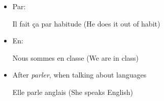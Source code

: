 \documentclass{book}
\begin{document}
\begin{itemize}
\begin{itemize}
                    \item Par:
                        \begin{center}
                            Il fait ça par habitude (He does it out of habit)
                        \end{center}

                    \item En: 
                        \begin{center}
                            Nous sommes en classe (We are in class)
                        \end{center}

                    \item After \textit{parler}, when talking about languages
                        \begin{center}
                            Elle parle anglais (She speaks English)
                        \end{center}
                \end{itemize}
        \end{itemize}
    
\end{document}
